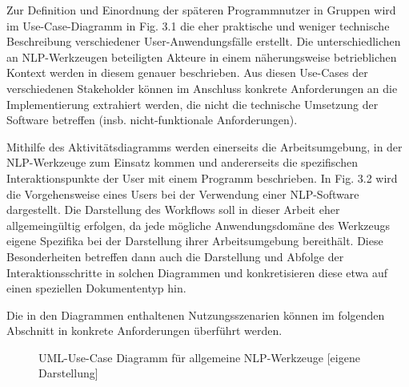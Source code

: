 \documentclass[12pt]{report}
\begin{document}
Zur Definition und Einordnung der späteren Programmnutzer in Gruppen wird im Use-Case-Diagramm in Fig. 3.1 die eher praktische und weniger technische Beschreibung verschiedener User-Anwendungsfälle erstellt. Die unterschiedlichen an NLP-Werkzeugen beteiligten Akteure in einem näherungsweise betrieblichen Kontext werden in diesem genauer beschrieben. Aus diesen Use-Cases der verschiedenen Stakeholder können im Anschluss konkrete Anforderungen an die Implementierung extrahiert werden, die nicht die technische Umsetzung der Software betreffen (insb. nicht-funktionale Anforderungen).

Mithilfe des Aktivitätsdiagramms werden einerseits die Arbeitsumgebung, in der NLP-Werkzeuge zum Einsatz kommen und andererseits die spezifischen Interaktionspunkte der User mit einem Programm beschrieben. In Fig. 3.2 wird die Vorgehensweise eines Users bei der Verwendung einer NLP-Software dargestellt. Die Darstellung des Workflows soll in dieser Arbeit eher allgemeingültig erfolgen, da jede mögliche Anwendungsdomäne des Werkzeugs eigene Spezifika bei der Darstellung ihrer Arbeitsumgebung bereithält. Diese Besonderheiten betreffen dann auch die Darstellung und Abfolge der Interaktionsschritte in solchen Diagrammen und konkretisieren diese etwa auf einen speziellen Dokumententyp hin.

Die in den Diagrammen enthaltenen Nutzungsszenarien können im folgenden Abschnitt in konkrete Anforderungen überführt werden.

\begin{figure}
\begin{center}
\caption{UML-Use-Case Diagramm für allgemeine NLP-Werkzeuge [eigene Darstellung]}
\end{center}
\end{figure}
\end{document}
